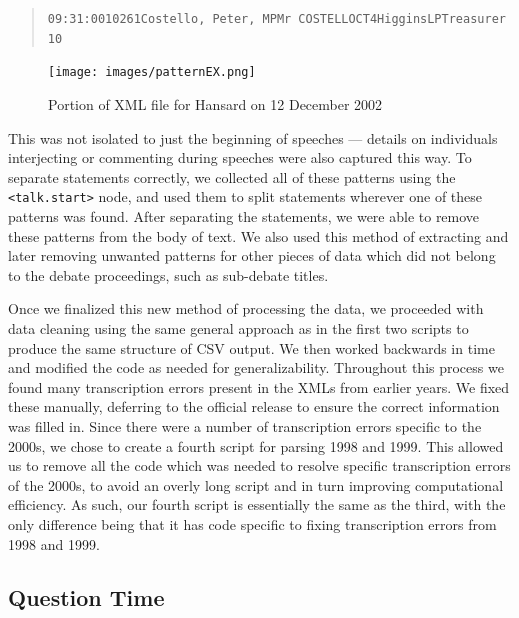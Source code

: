 \documentclass[
  letterpaper,
  DIV=11,
  numbers=noendperiod]{scrartcl}
\begin{document}
\begin{quote}
\texttt{09:31:0010261Costello,\ Peter,\ MPMr\ COSTELLOCT4HigginsLPTreasurer10}
\end{quote}

\begin{figure}

{\centering \texttt{[image: images/patternEX.png]}

}

\caption{\label{fig-patternEX}Portion of XML file for Hansard on 12
December 2002}

\end{figure}

This was not isolated to just the beginning of speeches --- details on
individuals interjecting or commenting during speeches were also
captured this way. To separate statements correctly, we collected all of
these patterns using the \texttt{\textless{}talk.start\textgreater{}}
node, and used them to split statements wherever one of these patterns
was found. After separating the statements, we were able to remove these
patterns from the body of text. We also used this method of extracting
and later removing unwanted patterns for other pieces of data which did
not belong to the debate proceedings, such as sub-debate titles.

Once we finalized this new method of processing the data, we proceeded
with data cleaning using the same general approach as in the first two
scripts to produce the same structure of CSV output. We then worked
backwards in time and modified the code as needed for generalizability.
Throughout this process we found many transcription errors present in
the XMLs from earlier years. We fixed these manually, deferring to the
official release to ensure the correct information was filled in. Since
there were a number of transcription errors specific to the 2000s, we
chose to create a fourth script for parsing 1998 and 1999. This allowed
us to remove all the code which was needed to resolve specific
transcription errors of the 2000s, to avoid an overly long script and in
turn improving computational efficiency. As such, our fourth script is
essentially the same as the third, with the only difference being that
it has code specific to fixing transcription errors from 1998 and 1999.

\hypertarget{sec-qa}{%
\subsection{Question Time}\label{sec-qa}}
\end{document}
